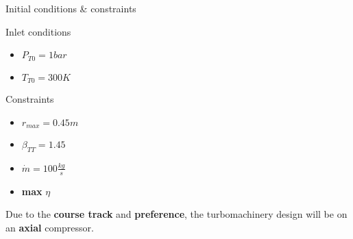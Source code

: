 \begin{frame}{Initial conditions \& constraints}
	\begin{block}{Inlet conditions}
		\begin{itemize}
			\item $P_{T0} = 1 bar$
			\item $T_{T0} = 300 K$
		\end{itemize}
	\end{block}
	\begin{alertblock}{Constraints}
		\begin{itemize}
			\item $r_{max} = 0.45 m$
			\item $\beta_{TT} = 1.45$
			\item $\dot{m} = 100 \frac{kg}{s}$
			\item \textbf{max} $\eta$
		\end{itemize}
	\end{alertblock}
	Due to the \textbf{course track} and \textbf{preference}, the turbomachinery design will be on an \textbf{axial} compressor.
\end{frame}
